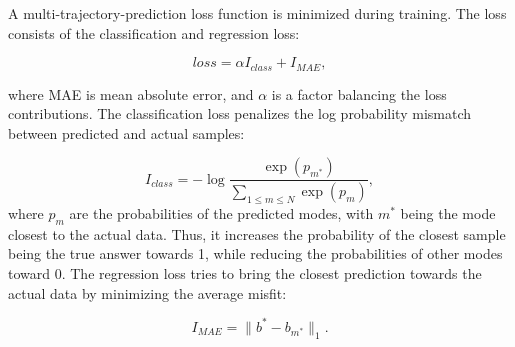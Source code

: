 
A multi-trajectory-prediction loss function is minimized during training. The loss consists of the classification and regression loss:

\begin{equation}
    loss = \alpha I_{class} + I_{MAE},
\end{equation}

where  MAE is mean absolute error, and $\alpha$ is a factor balancing the loss contributions. The classification loss penalizes the log probability mismatch between predicted and actual samples:

\begin{equation}
    I_{class} = -\log 
    \frac{\exp (p_{m^*})}
    {\sum\limits_{1 \leq m \leq N}\exp (p_{m})},
\end{equation}
where $p_m$ are the probabilities of the predicted modes, with $m^*$ being the mode closest to the actual data.
Thus, it increases the probability of the closest sample being the true answer towards 1, while reducing the probabilities of other modes toward 0.
The regression loss tries to bring the closest prediction towards the actual data by minimizing the average misfit:

\begin{equation}
    I_{MAE} = \lVert b^* - b_{m^*} \rVert_1.
\end{equation}

